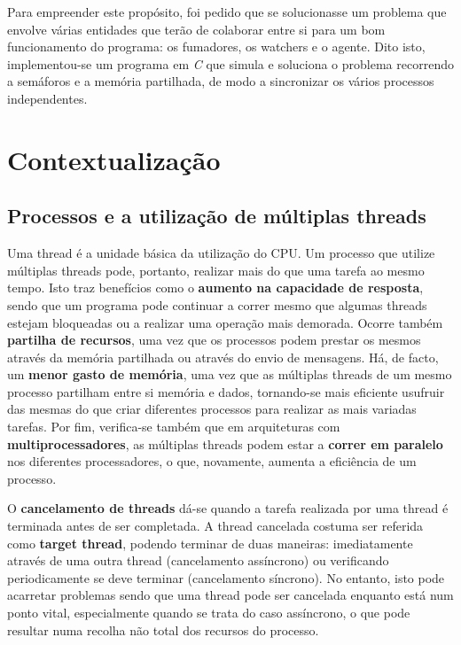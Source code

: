 \documentclass[10pt,portuguese]{article}
\begin{document}
\par Para empreender este propósito, foi pedido que se solucionasse um problema que envolve várias entidades que terão de colaborar entre si para um bom funcionamento do programa: os fumadores, os watchers e o agente. Dito isto, implementou-se um programa em \textit{C} que simula e soluciona o problema recorrendo a semáforos e a memória partilhada, de modo a sincronizar os vários processos independentes. 
\clearpage

\section{Contextualização}
\subsection{Processos e a utilização de múltiplas threads}
Uma thread é a unidade básica da utilização do CPU. Um processo que utilize múltiplas threads pode, portanto, realizar mais do que uma tarefa ao mesmo tempo. Isto traz benefícios como o \textbf{aumento na capacidade de resposta}, sendo que um programa pode continuar a correr mesmo que algumas threads estejam bloqueadas ou a realizar uma operação mais demorada. Ocorre também \textbf{partilha de recursos}, uma vez que os processos podem prestar os mesmos através da memória partilhada ou através do envio de mensagens. Há, de facto, um \textbf{menor gasto de memória}, uma vez que as múltiplas threads de um mesmo processo partilham entre si memória e dados, tornando-se mais eficiente usufruir das mesmas do que criar diferentes processos para realizar as mais variadas tarefas. Por fim, verifica-se também que em arquiteturas com \textbf{multiprocessadores}, as múltiplas threads podem estar a \textbf{correr em paralelo} nos diferentes processadores, o que, novamente, aumenta a eficiência de um processo.
\par O \textbf{cancelamento de threads} dá-se quando a tarefa realizada por uma thread é terminada antes de ser completada. A thread cancelada costuma ser referida como \textbf{target thread}, podendo terminar de duas maneiras: imediatamente através de uma outra thread (cancelamento assíncrono) ou verificando periodicamente se deve terminar (cancelamento síncrono). No entanto, isto pode acarretar problemas sendo que uma thread pode ser cancelada enquanto está num ponto vital, especialmente quando se trata do caso assíncrono, o que pode resultar numa recolha não total dos recursos do processo.
\end{document}
